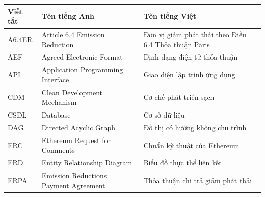 \documentclass[a4paper,oneside]{report}
\begin{document}
\begin{longtable}{@{}p{2.4cm}p{5.4cm}p{6.3cm}@{}}
\toprule
\textbf{Viết tắt} & \textbf{Tên tiếng Anh} & \textbf{Tên tiếng Việt} \\
\midrule
\endhead
\bottomrule
\endfoot
A6.4ER & Article 6.4 Emission Reduction           & Đơn vị giảm phát thải theo Điều 6.4 Thỏa thuận Paris \\
AEF    & Agreed Electronic Format                  & Định dạng điện tử thỏa thuận \\
API    & Application Programming Interface         & Giao diện lập trình ứng dụng \\
CDM    & Clean Development Mechanism               & Cơ chế phát triển sạch \\
CSDL   & Database                                  & Cơ sở dữ liệu \\
DAG    & Directed Acyclic Graph                    & Đồ thị có hướng không chu trình \\
ERC    & Ethereum Request for Comments             & Chuẩn kỹ thuật của Ethereum \\
ERD    & Entity Relationship Diagram               & Biểu đồ thực thể liên kết \\
ERPA   & Emission Reductions Payment Agreement     & Thỏa thuận chi trả giảm phát thải \\

\end{longtable}
\end{document}
